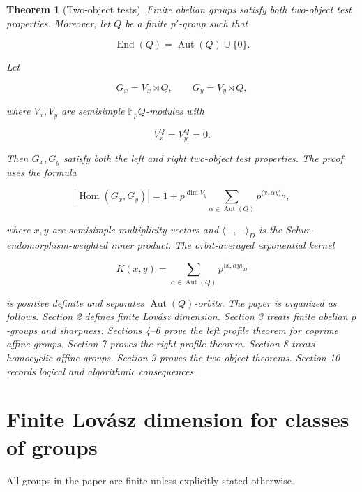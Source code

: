 \documentclass[11pt]{article}
\newtheorem{theorem}{Theorem}[section]
\begin{document}
\begin{theorem}[Two-object tests]
Finite abelian groups satisfy both two-object test properties. Moreover, let $Q$ be a finite $p'$-group such that

\[
\operatorname{End}(Q)=\operatorname{Aut}(Q)\cup\{0\}.
\]

Let

\[
G_x=V_x\rtimes Q,\qquad G_y=V_y\rtimes Q,
\]

where $V_x,V_y$ are semisimple $\mathbb F_pQ$-modules with

\[
V_x^Q=V_y^Q=0.
\]

Then $G_x,G_y$ satisfy both the left and right two-object test properties. The proof uses the formula

\[
|\operatorname{Hom}(G_x,G_y)|
=1+p^{\dim V_y}
\sum_{\alpha\in\operatorname{Aut}(Q)}
p^{\langle x,\alpha y\rangle_D},
\]

where $x,y$ are semisimple multiplicity vectors and $\langle-,-\rangle_D$ is the Schur-endomorphism-weighted inner product. The orbit-averaged exponential kernel

\[
K(x,y)=
\sum_{\alpha\in\operatorname{Aut}(Q)}
p^{\langle x,\alpha y\rangle_D}
\]

is positive definite and separates $\operatorname{Aut}(Q)$-orbits. The paper is organized as follows. Section 2 defines finite Lovász dimension. Section 3 treats finite abelian $p$-groups and sharpness. Sections 4--6 prove the left profile theorem for coprime affine groups. Section 7 proves the right profile theorem. Section 8 treats homocyclic affine groups. Section 9 proves the two-object theorems. Section 10 records logical and algorithmic consequences.

\end{theorem}

\section{Finite Lovász dimension for classes of groups}

All groups in the paper are finite unless explicitly stated otherwise.
\end{document}
